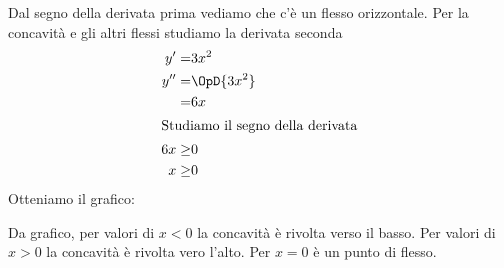 \begin{exercise}
\begin{itemize}
	Dal segno della derivata prima  vediamo che  c'è un flesso orizzontale.
	Per la concavità e gli altri flessi studiamo la derivata seconda
	\begin{align*}
	y'=&3x^2\\
	y''=&\OpD{3x^2}\\
	=&6x\\
	\intertext{Studiamo il segno della derivata}
	6x\geq&0\\
	x\geq&0\\
	\end{align*}
	Otteniamo il grafico:
	\begin{center}
		
	\end{center}
	Da grafico, per valori di $x<0$ la concavità è rivolta verso il basso. Per valori di $x>0$   la concavità è rivolta vero l'alto. Per $x=0$ è un punto di flesso.
	\begin{center}
		
	\end{center}
\end{itemize}

\end{exercise}

